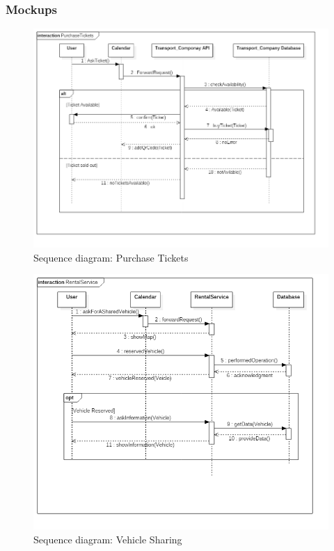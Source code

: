\subsubsection{Mockups}


\begin{figure}
	\centering
	\includegraphics[width=6in]{./diagrams/PurchaseTickets.png}
	\caption{Sequence diagram: Purchase Tickets}
	\label{fig:seqPurchaseTickets}
\end{figure}

\begin{figure}
	\centering
	\includegraphics[width=6in]{./diagrams/RentalService.png}
	\caption{Sequence diagram: Vehicle Sharing}
	\label{fig:seqVehicleSharing}
\end{figure}